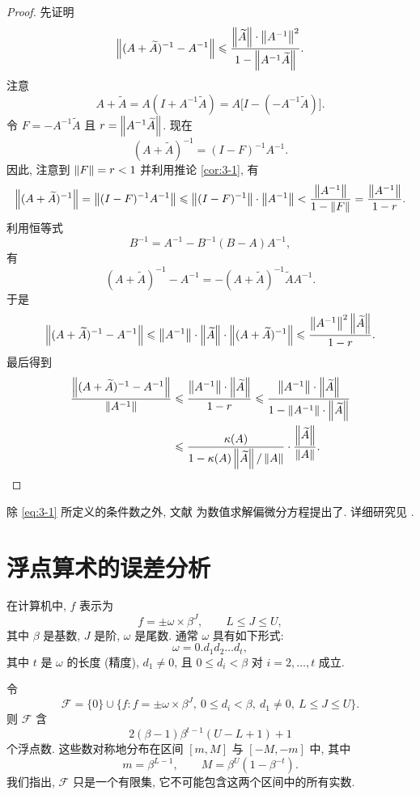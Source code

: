 \begin{proof}
先证明
\[
  \left\|(A+\widetilde{A})^{-1}-A^{-1}\right\|
  \leqslant\frac{\left\|\widetilde{A}\right\|\cdot\left\|A^{-1}\right\|^2}{1-\left\|A^{-1}\widetilde{A}\right\|}.
\]
注意
\[
  A+\widetilde{A}=A(I+A^{-1}\widetilde{A})=A\bigl[I-(-A^{-1}\widetilde{A})\bigr].
\]
令 $F=-A^{-1}\widetilde{A}$ 且 $r=\left\|A^{-1}\widetilde{A}\right\|$. 现在
\[
  (A+\widetilde{A})^{-1}=(I-F)^{-1}A^{-1}.
\]
因此, 注意到 $\left\|F\right\|=r<1$ 并利用推论 \ref{cor:3-1}, 有
\[
  \left\|(A+\widetilde{A})^{-1}\right\|=\left\|(I-F)^{-1}A^{-1}\right\|
  \leqslant\left\|(I-F)^{-1}\right\|\cdot\left\|A^{-1}\right\|
  <\frac{\left\|A^{-1}\right\|}{1-\left\|F\right\|}=\frac{\left\|A^{-1}\right\|}{1-r}.
\]
利用恒等式
\[
  B^{-1}=A^{-1}-B^{-1}(B-A)A^{-1},
\]
有
\[
  (A+\widetilde{A})^{-1}-A^{-1}=-(A+\widetilde{A})^{-1}\widetilde{A}A^{-1}.
\]
于是
\[
  \left\|(A+\widetilde{A})^{-1}-A^{-1}\right\|
  \leqslant\left\|A^{-1}\right\|\cdot\left\|\widetilde{A}\right\|\cdot\left\|(A+\widetilde{A})^{-1}\right\|
  \leqslant\frac{\left\|A^{-1}\right\|^2\left\|\widetilde{A}\right\|}{1-r}.
\]
最后得到
\[
  \begin{aligned}
    \frac{\left\|(A+\widetilde{A})^{-1}-A^{-1}\right\|}{\left\|A^{-1}\right\|}
    &\leqslant\frac{\left\|A^{-1}\right\|\cdot\left\|\widetilde{A}\right\|}{1-r}
     \leqslant\frac{\left\|A^{-1}\right\|\cdot\left\|\widetilde{A}\right\|}{1-\left\|A^{-1}\right\|\cdot\left\|\widetilde{A}\right\|}\\
    &\leqslant\frac{\kappa(A)}{1-\kappa(A)\left\|\widetilde{A}\right\|/\left\|A\right\|}
     \cdot\frac{\left\|\widetilde{A}\right\|}{\left\|A\right\|}.
  \end{aligned}
\]
\end{proof}

\begin{mremark}
除 \eqref{eq:3-1} 所定义的条件数之外, 文献 \cite{src:22} 为数值求解偏微分方程提出了. 详细研究见 \cite{src:57}.
\end{mremark}

\section{浮点算术的误差分析}

在计算机中,  $f$ 表示为
\[
  f=\pm\omega\times\beta^J,\qquad L\leqslant J\leqslant U,
\]
其中 $\beta$ 是基数, $J$ 是阶, $\omega$ 是尾数. 通常 $\omega$ 具有如下形式:
\[
  \omega=0.d_1d_2\ldots d_t,
\]
其中 $t$ 是 $\omega$ 的长度 (精度), $d_1\neq0$, 且 $0\leqslant d_i<\beta$ 对 $i=2,\ldots,t$ 成立.

令
\[
  \mathcal{F}=\{0\}\cup\{f:f=\pm\omega\times\beta^J,\ 0\leqslant d_i<\beta,\ d_1\neq0,\ L\leqslant J\leqslant U\}.
\]
则 $\mathcal{F}$ 含
\[
  2(\beta-1)\beta^{t-1}(U-L+1)+1
\]
个浮点数. 这些数对称地分布在区间 $[m,M]$ 与 $[-M,-m]$ 中, 其中
\begin{equation}
  m=\beta^{L-1},\qquad M=\beta^U(1-\beta^{-t}).
  \label{eq:3-5}
\end{equation}
我们指出, $\mathcal{F}$ 只是一个有限集, 它不可能包含这两个区间中的所有实数.

